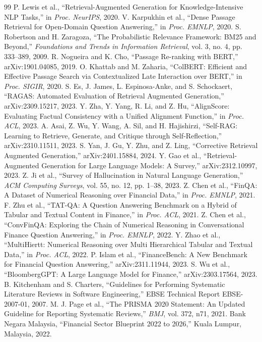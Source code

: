 \documentclass[10pt,twocolumn,letterpaper]{article}
\begin{document}
\begin{thebibliography}{99}
 P. Lewis et al., ``Retrieval-Augmented Generation for Knowledge-Intensive NLP Tasks,'' in \emph{Proc. NeurIPS}, 2020.
 V. Karpukhin et al., ``Dense Passage Retrieval for Open-Domain Question Answering,'' in \emph{Proc. EMNLP}, 2020.
 S. Robertson and H. Zaragoza, ``The Probabilistic Relevance Framework: BM25 and Beyond,'' \emph{Foundations and Trends in Information Retrieval}, vol. 3, no. 4, pp. 333--389, 2009.
 R. Nogueira and K. Cho, ``Passage Re-ranking with BERT,'' arXiv:1901.04085, 2019.
 O. Khattab and M. Zaharia, ``ColBERT: Efficient and Effective Passage Search via Contextualized Late Interaction over BERT,'' in \emph{Proc. SIGIR}, 2020.
 S. Es, J. James, L. Espinosa-Anke, and S. Schockaert, ``RAGAS: Automated Evaluation of Retrieval Augmented Generation,'' arXiv:2309.15217, 2023.
 Y. Zha, Y. Yang, R. Li, and Z. Hu, ``AlignScore: Evaluating Factual Consistency with a Unified Alignment Function,'' in \emph{Proc. ACL}, 2023.
 A. Asai, Z. Wu, Y. Wang, A. Sil, and H. Hajishirzi, ``Self-RAG: Learning to Retrieve, Generate, and Critique through Self-Reflection,'' arXiv:2310.11511, 2023.
 S. Yan, J. Gu, Y. Zhu, and Z. Ling, ``Corrective Retrieval Augmented Generation,'' arXiv:2401.15884, 2024.
 Y. Gao et al., ``Retrieval-Augmented Generation for Large Language Models: A Survey,'' arXiv:2312.10997, 2023.
 Z. Ji et al., ``Survey of Hallucination in Natural Language Generation,'' \emph{ACM Computing Surveys}, vol. 55, no. 12, pp. 1--38, 2023.
 Z. Chen et al., ``FinQA: A Dataset of Numerical Reasoning over Financial Data,'' in \emph{Proc. EMNLP}, 2021.
 F. Zhu et al., ``TAT-QA: A Question Answering Benchmark on a Hybrid of Tabular and Textual Content in Finance,'' in \emph{Proc. ACL}, 2021.
 Z. Chen et al., ``ConvFinQA: Exploring the Chain of Numerical Reasoning in Conversational Finance Question Answering,'' in \emph{Proc. EMNLP}, 2022.
 Y. Zhao et al., ``MultiHiertt: Numerical Reasoning over Multi Hierarchical Tabular and Textual Data,'' in \emph{Proc. ACL}, 2022.
 P. Islam et al., ``FinanceBench: A New Benchmark for Financial Question Answering,'' arXiv:2311.11944, 2023.
 S. Wu et al., ``BloombergGPT: A Large Language Model for Finance,'' arXiv:2303.17564, 2023.
 B. Kitchenham and S. Charters, ``Guidelines for Performing Systematic Literature Reviews in Software Engineering,'' EBSE Technical Report EBSE-2007-01, 2007.
 M. J. Page et al., ``The PRISMA 2020 Statement: An Updated Guideline for Reporting Systematic Reviews,'' \emph{BMJ}, vol. 372, n71, 2021.
 Bank Negara Malaysia, ``Financial Sector Blueprint 2022 to 2026,'' Kuala Lumpur, Malaysia, 2022.

\end{thebibliography}
\end{document}
